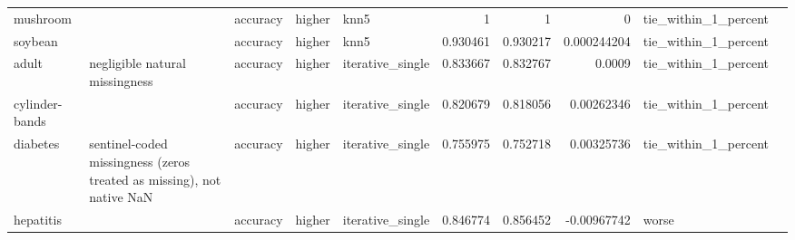 \begin{table}[ht]
{\begin{tabular}{lllllrrrll}
 mushroom       &                                                                       & accuracy                       & higher             & knn5             &                   1        &               1        &                     0           & tie\_within\_1\_percent &                                                                                                                    \\
 soybean        &                                                                       & accuracy                       & higher             & knn5             &                   0.930461 &               0.930217 &                     0.000244204 & tie\_within\_1\_percent &                                                                                                                    \\
 adult          & negligible natural missingness                                        & accuracy                       & higher             & iterative\_single &                   0.833667 &               0.832767 &                     0.0009      & tie\_within\_1\_percent &                                                                                                                    \\
 cylinder-bands &                                                                       & accuracy                       & higher             & iterative\_single &                   0.820679 &               0.818056 &                     0.00262346  & tie\_within\_1\_percent &                                                                                                                    \\
 diabetes       & sentinel-coded missingness (zeros treated as missing), not native NaN & accuracy                       & higher             & iterative\_single &                   0.755975 &               0.752718 &                     0.00325736  & tie\_within\_1\_percent &                                                                                                                    \\
 hepatitis      &                                                                       & accuracy                       & higher             & iterative\_single &                   0.846774 &               0.856452 &                    -0.00967742  & worse                &                                                                                                                    \\

\end{tabular}}
\end{table}
